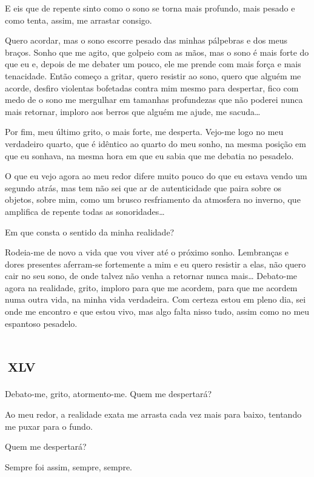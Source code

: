 E eis que de repente sinto como o sono se torna mais profundo, mais pesado e como tenta, assim, me arrastar consigo.

Quero acordar, mas o sono escorre pesado das minhas pálpebras e dos meus braços. Sonho que me agito, que golpeio com as mãos, mas o sono é mais forte do que eu e, depois de me debater um pouco, ele me prende com mais força e mais tenacidade. Então começo a gritar, quero resistir ao sono, quero que alguém me acorde, desfiro violentas bofetadas contra mim mesmo para despertar, fico com medo de o sono me mergulhar em tamanhas profundezas que não poderei nunca mais retornar, imploro aos berros que alguém me ajude, me sacuda\ldots{}

Por fim, meu último grito, o mais forte, me desperta. Vejo-me logo no meu verdadeiro quarto, que é idêntico ao quarto do meu sonho, na mesma posição em que eu sonhava, na mesma hora em que eu sabia que me debatia no pesadelo.

O que eu vejo agora ao meu redor difere muito pouco do que eu estava vendo um segundo atrás, mas tem não sei que ar de autenticidade que paira sobre os objetos, sobre mim, como um brusco resfriamento da atmosfera no inverno, que amplifica de repente todas as sonoridades\ldots{}

Em que consta o sentido da minha realidade?

Rodeia-me de novo a vida que vou viver até o próximo sonho. Lembranças e dores presentes aferram-se fortemente a mim e eu quero resistir a elas, não quero cair no seu sono, de onde talvez não venha a retornar nunca mais\ldots{}
Debato-me agora na realidade, grito, imploro para que me acordem, para que me acordem numa outra vida, na minha vida verdadeira. Com certeza estou em pleno dia, sei onde me encontro e que estou vivo, mas algo falta nisso tudo, assim como no meu espantoso pesadelo.


\chapter*{\small{}\,\Large\centering\textsc{xlv}\,\small{}}

Debato-me, grito, atormento-me. Quem me despertará?

Ao meu redor, a realidade exata me arrasta cada vez mais para baixo, tentando me puxar para o fundo.

Quem me despertará?

Sempre foi assim, sempre, sempre.
